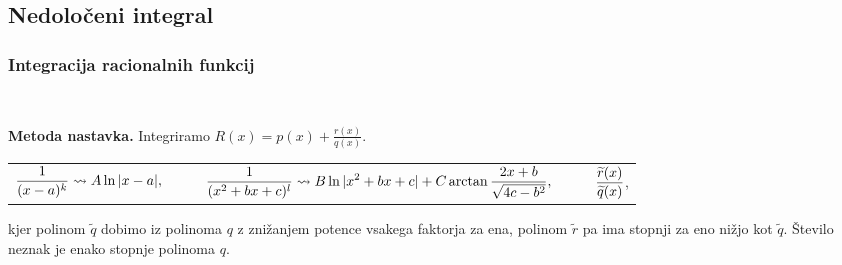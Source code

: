 \subsection{Nedoločeni integral}

\subsubsection{Integracija racionalnih funkcij} \

\textbf{Metoda nastavka.} Integriramo \(R(x) = p(x) + \frac{r(x)}{q(x)}\).
    \begin{center}
        \begin{tabular}{ l c r }
        \(\displaystyle \frac{1}{(x-a)^k} \leadsto A \ln |x-a|,\) & \(\displaystyle \qquad \frac{1}{(x^2+bx+c)^l} \leadsto B \ln |x^2+bx+c| + C \arctan \frac{2x+b}{\sqrt{4c-b^2}},\) &
        \(\displaystyle \qquad \frac{\widetilde{r}(x)}{\widetilde{q}(x)}\),
        \end{tabular}
    \end{center}
    kjer polinom $\widetilde{q}$ dobimo iz polinoma $q$ z znižanjem potence vsakega faktorja za ena, polinom $\widetilde{r}$ pa ima stopnji za eno nižjo kot $\widetilde{q}$.
    Število neznak je enako stopnje polinoma $q$.

